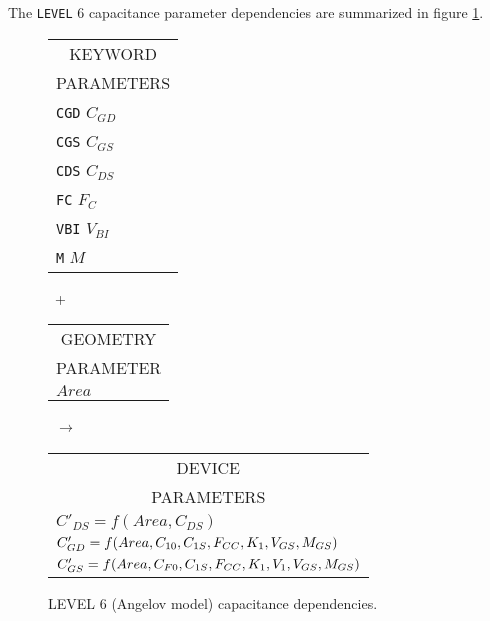 The {\tt LEVEL} 6 capacitance parameter dependencies are summarized in figure
\ref{blevel6cap}.\\[0.2in]
\begin{figure}[h]
\begin{tabular}[t]{|p{1in}|}
\hline
\multicolumn{1}{|c|}{KEYWORD} \\
\multicolumn{1}{|c|}{PARAMETERS} \\
\hline
\hline
{\tt CGD} \hfill $C_{GD}$\\
{\tt CGS} \hfill $C_{GS}$\\
{\tt CDS} \hfill $C_{DS}$\\
{\tt FC} \hfill $F_C$\\
{\tt VBI} \hfill $V_{BI}$\\
{\tt M} \hfill $M$\\
\hline
\end{tabular}
\hfill
\parbox{0.2in}{\ \vspace*{0.2in}\newline +}
\hfill
\begin{tabular}[t]{|p{1in}|}
\hline
\multicolumn{1}{|c|}{GEOMETRY} \\
\multicolumn{1}{|c|}{PARAMETER} \\
\hline
\hspace*{\fill}$Area$\\
\hline
\end{tabular}
\hfill
\parbox{0.2in}{\ \vspace*{0.2in}\newline $\rightarrow$}
\hfill
\begin{tabular}[t]{|p{1.8in}|}
\hline
\multicolumn{1}{|c|}{DEVICE} \\
\multicolumn{1}{|c|}{PARAMETERS} \\
\hline
$C'_{DS} = f(Area, C_{DS})$\\
$C'_{GD} = f(Area, C_{10}, C_{1S},
      \newline\hspace*{\fill} F_{CC}, K_1, V_{GS}, M_{GS})$\\
$C'_{GS} = f(Area, C_{F0}, C_{1S},
      \newline\hspace*{\fill} F_{CC}, K_1, V_1, V_{GS}, M_{GS})$\\
\hline
\end{tabular}
\caption{LEVEL 6 (Angelov model) capacitance dependencies.
\label{blevel6cap}}
\end{figure}

